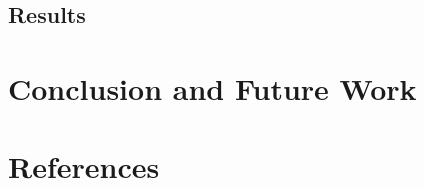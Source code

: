 \documentclass[12pt]{article}
\begin{document}
\subsection{Results}
\par %

\section{Conclusion and Future Work}
\par %





\newpage
\section{References}

\printbibliography
\end{document}
